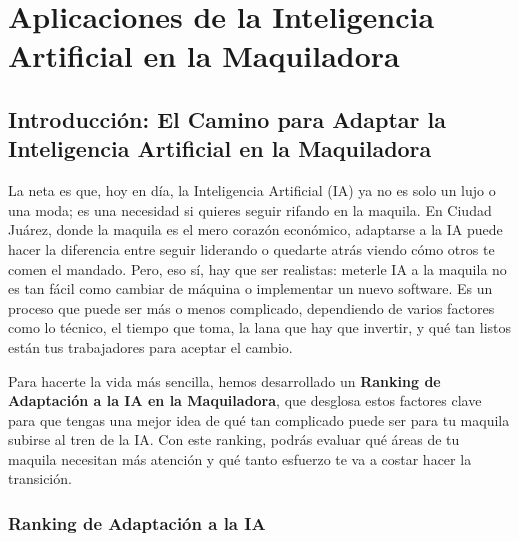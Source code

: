 \documentclass[
  letterpaper,
]{book}
\begin{document}

\chapter{Aplicaciones de la Inteligencia Artificial en la
Maquiladora}\label{aplicaciones-de-la-inteligencia-artificial-en-la-maquiladora}

\section{Introducción: El Camino para Adaptar la Inteligencia Artificial
en la
Maquiladora}\label{introducciuxf3n-el-camino-para-adaptar-la-inteligencia-artificial-en-la-maquiladora}

La neta es que, hoy en día, la Inteligencia Artificial (IA) ya no es
solo un lujo o una moda; es una necesidad si quieres seguir rifando en
la maquila. En Ciudad Juárez, donde la maquila es el mero corazón
económico, adaptarse a la IA puede hacer la diferencia entre seguir
liderando o quedarte atrás viendo cómo otros te comen el mandado. Pero,
eso sí, hay que ser realistas: meterle IA a la maquila no es tan fácil
como cambiar de máquina o implementar un nuevo software. Es un proceso
que puede ser más o menos complicado, dependiendo de varios factores
como lo técnico, el tiempo que toma, la lana que hay que invertir, y qué
tan listos están tus trabajadores para aceptar el cambio.

Para hacerte la vida más sencilla, hemos desarrollado un \textbf{Ranking
de Adaptación a la IA en la Maquiladora}, que desglosa estos factores
clave para que tengas una mejor idea de qué tan complicado puede ser
para tu maquila subirse al tren de la IA. Con este ranking, podrás
evaluar qué áreas de tu maquila necesitan más atención y qué tanto
esfuerzo te va a costar hacer la transición.

\subsection{Ranking de Adaptación a la
IA}\label{ranking-de-adaptaciuxf3n-a-la-ia}
\end{document}
